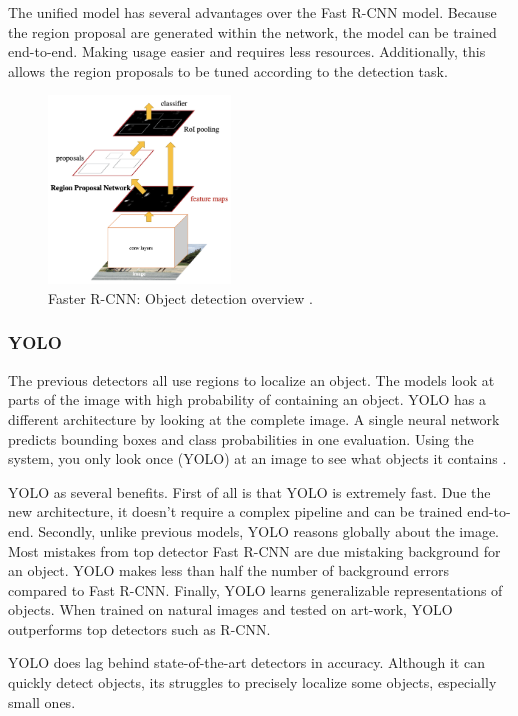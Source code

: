 The unified model has several advantages over the Fast R-CNN model. Because the region proposal are generated within the network, the model can be trained end-to-end. Making usage easier and requires less resources. Additionally, this allows the region proposals to be tuned according to the detection task.


\begin{figure}[ht]
\begin{center}
\includegraphics[height=5cm,keepaspectratio]{images/2_literature/faster-r-cnn.png}
\end{center}
\caption{Faster R-CNN: Object detection overview \cite{Ren2015}.}
\end{figure}


\subsubsection{YOLO}
The previous detectors all use regions to localize an object. The models look at parts of the image with high probability of containing an object. YOLO has a different architecture by looking at the complete image. A single neural network predicts bounding boxes and class probabilities in one evaluation. Using the system, you only look once (YOLO) at an image to see what objects it contains \cite{Redmon2016}.

YOLO as several benefits. First of all is that YOLO is extremely fast. Due the new architecture, it doesn't require a complex pipeline and can be trained end-to-end. Secondly, unlike previous models, YOLO reasons globally about the image. Most mistakes from top detector Fast R-CNN are due mistaking background for an object. YOLO makes less than half the number of background errors compared to Fast R-CNN. Finally, YOLO learns generalizable representations of objects. When trained on natural images and tested on art-work, YOLO outperforms top detectors such as R-CNN. 

YOLO does lag behind state-of-the-art detectors in accuracy. Although it can quickly detect objects, its struggles to precisely localize some objects, especially small ones. 

